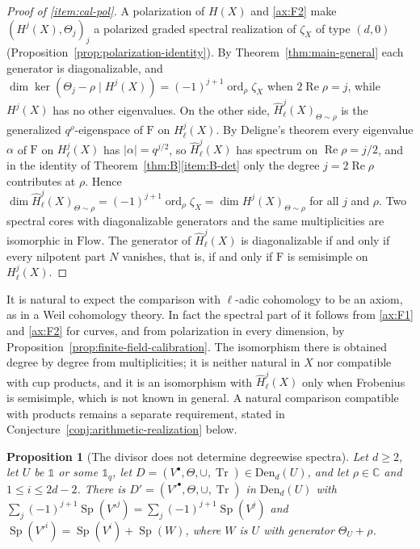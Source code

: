\documentclass[11pt]{amsart}
\theoremstyle{plain}
\newtheorem{proposition}[theorem]{Proposition}
\theoremstyle{definition}
\theoremstyle{remark}
\numberwithin{equation}{section}
\newcommand{\C}{\mathbb{C}}
\newcommand{\Den}{\mathrm{Den}}
\newcommand{\Flow}{\mathrm{Flow}}
\DeclareMathOperator{\Tr}{Tr}
\DeclareMathOperator{\Rea}{Re}
\DeclareMathOperator{\ord}{ord}
\renewcommand{\Re}{\Rea}
\begin{document}
\begin{proof}[Proof of \eqref{item:cal-pol}]
A polarization of $H(X)$ and \ref{ax:F2} make
$(H^j(X),\Theta_j)_j$ a polarized graded spectral realization of
$\zeta_X$ of type $(d,0)$
(Proposition~\ref{prop:polarization-identity}). By
Theorem~\ref{thm:main-general} each generator is diagonalizable, and
$\dim\ker(\Theta_j-\rho\mid H^j(X))=(-1)^{j+1}\ord_\rho\zeta_X$ when
$2\Re\rho=j$, while $H^j(X)$ has no other eigenvalues. On the other
side, $\widehat H^j_\ell(X)_{\Theta\sim\rho}$ is the generalized
$q^\rho$-eigenspace of $\mathrm F$ on $H^j_\ell(X)$. By Deligne's theorem
\cite[Th\'eor\`eme~(1.6), p.~276]{Deligne1974WeilI} every eigenvalue
$\alpha$ of $\mathrm F$ on $H^j_\ell(X)$ has $|\alpha|=q^{j/2}$, so
$\widehat H^j_\ell(X)$ has spectrum on $\Re\rho=j/2$, and in the identity of
Theorem~\ref{thm:B}\ref{item:B-det} only the degree $j=2\Re\rho$
contributes at $\rho$. Hence
$\dim\widehat H^j_\ell(X)_{\Theta\sim\rho}=(-1)^{j+1}\ord_\rho\zeta_X
=\dim H^j(X)_{\Theta\sim\rho}$ for all $j$ and $\rho$. Two spectral
cores with diagonalizable generators and the same multiplicities are
isomorphic in $\Flow$. The generator of $\widehat H^j_\ell(X)$ is
diagonalizable if and only if every nilpotent part $N$ vanishes, that
is, if and only if $\mathrm F$ is semisimple on $H^j_\ell(X)$.
\end{proof}

It is natural to expect the comparison with $\ell$-adic cohomology to
be an axiom, as in a Weil cohomology theory. In fact the spectral part
of it follows from \ref{ax:F1} and \ref{ax:F2} for curves, and from
polarization in every dimension, by
Proposition~\ref{prop:finite-field-calibration}. The isomorphism there
is obtained degree by degree from multiplicities; it is neither
natural in $X$ nor compatible with cup products, and it is an
isomorphism with $\widehat H^j_\ell(X)$ only when Frobenius is semisimple,
which is not known in general. A natural comparison compatible with
products remains a separate requirement, stated in
Conjecture~\ref{conj:arithmetic-realization} below.

\begin{proposition}[The divisor does not determine degreewise spectra]
\label{prop:calibration-cancel}
Let $d\ge2$, let $U$ be $\mathbb 1$ or some $\mathbb 1_q$, let
$D=(V^\bullet,\Theta,\cup,\Tr)\in\Den_d(U)$, and let $\rho\in\C$ and
$1\le i\le2d-2$. There is $D'=(V'^\bullet,\Theta,\cup,\Tr)$ in
$\Den_d(U)$ with
$\sum_j(-1)^{j+1}\operatorname{Sp}(V'^j)
=\sum_j(-1)^{j+1}\operatorname{Sp}(V^j)$ and
$\operatorname{Sp}(V'^i)=\operatorname{Sp}(V^i)+\operatorname{Sp}(W)$,
where $W$ is $U$ with generator $\Theta_U+\rho$.
\end{proposition}
\end{document}
